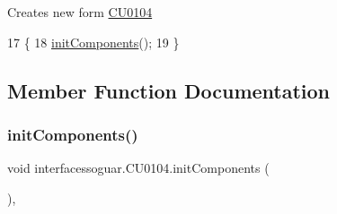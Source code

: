 Creates new form \mbox{\hyperlink{classinterfacessoguar_1_1_c_u0104}{C\+U0104}} 
\begin{DoxyCode}
17                     \{
18         \mbox{\hyperlink{classinterfacessoguar_1_1_c_u0104_a0fc3161c12feb33b56367fb1823448d4}{initComponents}}();
19     \}
\end{DoxyCode}


\subsection{Member Function Documentation}
\mbox{\label{classinterfacessoguar_1_1_c_u0104_a0fc3161c12feb33b56367fb1823448d4}} 
\subsubsection{\texorpdfstring{init\+Components()}{initComponents()}}
{\footnotesize\ttfamily void interfacessoguar.\+C\+U0104.\+init\+Components (\begin{DoxyParamCaption}{ }\end{DoxyParamCaption})\hspace{0.3cm}{\ttfamily [inline]}, {\ttfamily [private]}}

